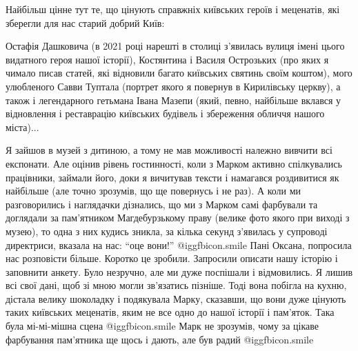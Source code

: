 Найбільш цінне тут те, що цінують справжніх київських героїв і меценатів, які
зберегли для нас старий добрий Київ: 

Остафія Дашковича (в 2021 році нарешті в столиці з’явилась вулиця імені цього
видатного героя нашої історії), Костянтина і Василя Острозьких (про яких я
чимало писав статей, які відновили багато київських святинь своїм коштом), мого
улюбленого Савви Туптала (портрет якого я повернув в Кирилівську церкву), а
також і легендарного гетьмана Івана Мазепи (який, певно, найбільше вклався у
відновлення і реставрацію київських будівель і збереження обличчя нашого
міста)...

Я зайшов в музей з дитиною, а тому не мав можливості належно вивчити всі
експонати. Але оцінив рівень гостинності, коли з Марком активно спілкувались
працівники, займали його, доки я вичитував тексти і намагався роздивитися як
найбільше (але точно зрозумів, що ще повернусь і не раз). А коли ми
разговорились і наглядачки дізнались, що ми з Марком самі фарбували та
доглядали за пам’ятником Магдебурзькому праву (велике фото якого при виході з
музею), то одна з них кудись зникла, за кілька секунд з’явилась у супроводі
директриси, вказала на нас: \enquote{оце вони!}  @igg{fbicon.smile}  Пані Оксана, попросила нас
розповісти більше. Коротко це зробили. Запросили описати нашу історію і
заповнити анкету. Було незручно, але ми дуже поспішали і відмовились. Я лишив
всі свої дані, щоб зі мною могли зв’язатись пізніше. Тоді вона побігла на
кухню, дістала велику шоколадку і подякувала Марку, сказавши, що вони дуже
цінують таких київських меценатів, яким не все одно до нашої історії і
пам’яток. Така була мі-мі-мішна сцена  @igg{fbicon.smile}  Марк не зрозумів, чому за цікаве
фарбування пам’ятника ще щось і дають, але був радий  @igg{fbicon.smile}  

